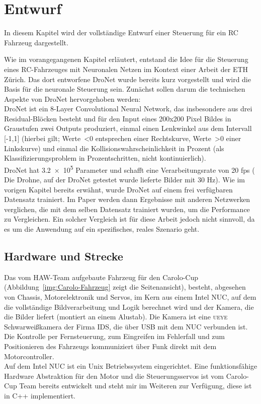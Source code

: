 %
\chapter{Entwurf}
In diesem Kapitel wird der vollständige Entwurf einer Steuerung für ein RC Fahrzeug dargestellt.

Wie im vorangegangenen Kapitel erläutert, entstand die Idee für die Steuerung eines RC-Fahrzeuges mit Neuronalen Netzen im Kontext einer Arbeit der ETH Zürich.
Das dort entworfene DroNet wurde bereits kurz vorgestellt und wird die Basis für die neuronale Steuerung sein. Zunächst sollen darum die technischen Aspekte von DroNet hervorgehoben werden: \\

DroNet ist ein 8-Layer Convolutional Neural Network, das insbesondere aus drei Residual-Blöcken besteht und für den Input eines 200x200 Pixel Bildes in Graustufen zwei Outputs produziert, einmal einen Lenkwinkel aus dem Intervall [-1,1] (hierbei gilt; Werte~<0 entsprechen einer Rechtskurve, Werte~>0 einer Linkskurve)  und einmal die Kollisionswahrscheinlichkeit in Prozent (als Klassifizierungsproblem in Prozentschritten, nicht kontinuierlich).\\
DroNet hat \num{3.2e5} Parameter und schafft eine Verarbeitungsrate von 20 fps ( Die Drohne, auf der DroNet getestet wurde lieferte Bilder mit 30 Hz).
Wie im vorigen Kapitel bereits erwähnt, wurde DroNet auf einem frei verfügbaren Datensatz trainiert. Im Paper werden dann Ergebnisse mit anderen Netzwerken verglichen, die mit dem selben Datensatz trainiert wurden, um die Performance zu Vergleichen. Ein solcher Vergleich ist für diese Arbeit jedoch nicht sinnvoll, da es um die Anwendung auf ein spezifisches, reales Szenario geht. 

\section{Hardware und Strecke}

Das vom HAW-Team aufgebaute Fahrzeug für den Carolo-Cup (Abbildung~\ref{img:Carolo-Fahrzeug} zeigt die Seitenansicht), besteht, abgesehen von Chassis, Motorelektronik und Servos, im Kern aus einem Intel NUC, auf dem die vollständige Bildverarbeitung und Logik berechnet wird und der Kamera, die die Bilder liefert (montiert an einem Alustab). Die Kamera ist eine \textsc{ueye} Schwarweißkamera der Firma IDS, die über USB mit dem NUC verbunden ist. 
Die Kontrolle per Fernsteuerung, zum Eingreifen im Fehlerfall und zum Positionieren des Fahrzeugs kommuniziert über Funk direkt mit dem Motorcontroller.\\
Auf dem Intel NUC ist ein Unix Betriebssystem eingerichtet.
Eine funktionsfähige Hardware Abstraktion für den Motor und die Steuerungsservos ist vom Carolo-Cup Team bereits entwickelt und steht mir im Weiteren zur Verfügung, diese ist in C++ implementiert.\\

